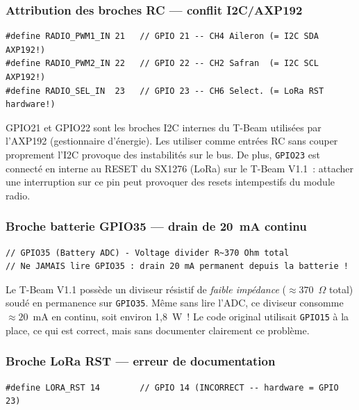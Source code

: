 \documentclass[12pt,a4paper]{article}
\newcommand{\gpio}[1]{\texttt{GPIO#1}}
\begin{document}
\subsubsection{Attribution des broches RC — conflit I2C/AXP192}

\begin{lstlisting}[style=cpp, caption={config\_pins.h original -- broches RC sur I2C}]
#define RADIO_PWM1_IN 21   // GPIO 21 -- CH4 Aileron (= I2C SDA AXP192!)
#define RADIO_PWM2_IN 22   // GPIO 22 -- CH2 Safran  (= I2C SCL AXP192!)
#define RADIO_SEL_IN  23   // GPIO 23 -- CH6 Select. (= LoRa RST hardware!)
\end{lstlisting}

\begin{warningbox}
  GPIO21 et GPIO22 sont les broches I2C internes du T-Beam utilisées
  par l'AXP192 (gestionnaire d'énergie). Les utiliser comme entrées
  RC sans couper proprement l'I2C provoque des instabilités sur le bus.
  De plus, \gpio{23} est connecté en interne au RESET du SX1276 (LoRa)
  sur le T-Beam V1.1~: attacher une interruption sur ce pin peut
  provoquer des resets intempestifs du module radio.
\end{warningbox}

\subsubsection{Broche batterie GPIO35 — drain de 20~mA continu}

\begin{lstlisting}[style=cpp, caption={config\_pins.h original -- broche batterie}]
// GPIO35 (Battery ADC) - Voltage divider R~370 Ohm total
// Ne JAMAIS lire GPIO35 : drain 20 mA permanent depuis la batterie !
\end{lstlisting}

Le T-Beam V1.1 possède un diviseur résistif de \emph{faible impédance}
($\approx 370$~$\Omega$ total) soudé en permanence sur \gpio{35}. Même sans
lire l'ADC, ce diviseur consomme $\approx 20$~mA en continu, soit environ
1,8~W~! Le code original utilisait \gpio{15} à la place, ce qui est correct,
mais sans documenter clairement ce problème.

\subsubsection{Broche LoRa RST — erreur de documentation}

\begin{lstlisting}[style=cpp, caption={config\_pins.h original -- LoRa RST incorrect}]
#define LORA_RST 14        // GPIO 14 (INCORRECT -- hardware = GPIO 23)
\end{lstlisting}
\end{document}
